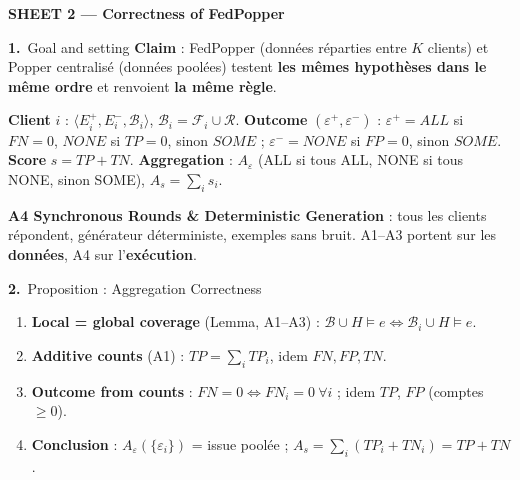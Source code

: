 \documentclass[10pt]{article}
\newcommand{\num}[1]{\textcolor{marine}{\textbf{#1.}}~}
\begin{document}
\vspace{6pt}
{\large\bfseries\textcolor{marine}{SHEET 2 --- Correctness of FedPopper}}\par\vspace{2pt}
\begin{minipage}[t]{0.495\textwidth}\vspace{0pt}
\begin{bloc}[fontupper=\scriptsize\raggedright]{\num{1}Goal and setting}
\textbf{Claim} : FedPopper (données réparties entre $K$ clients) et Popper centralisé (données poolées) testent \textbf{les mêmes hypothèses dans le même ordre} et renvoient \textbf{la même règle}.\par
\textbf{Client} $i$ : $\langle E_i^+,E_i^-,\mathcal{B}_i\rangle$, $\mathcal{B}_i=\mathcal{F}_i\cup\mathcal{R}$. \textbf{Outcome} $(\varepsilon^+,\varepsilon^-)$ : $\varepsilon^+=\mathit{ALL}$ si $FN=0$, $\mathit{NONE}$ si $TP=0$, sinon $\mathit{SOME}$ ; $\varepsilon^-=\mathit{NONE}$ si $FP=0$, sinon $\mathit{SOME}$. \textbf{Score} $s=TP+TN$. \textbf{Aggregation} : $A_\varepsilon$ (ALL si tous ALL, NONE si tous NONE, sinon SOME), $A_s=\sum_i s_i$.\par
\textbf{A4 Synchronous Rounds \& Deterministic Generation} : tous les clients répondent, générateur déterministe, exemples sans bruit. A1--A3 portent sur les \textbf{données}, A4 sur l'\textbf{exécution}.
\end{bloc}
\vspace{2pt}
\begin{bloc}[fontupper=\scriptsize\raggedright]{\num{2}Proposition : Aggregation Correctness}
\begin{enumerate}[leftmargin=12pt, itemsep=0pt, topsep=1pt]
  \item \textbf{Local = global coverage} (Lemma, A1--A3) : $\mathcal{B}\cup H\models e\iff\mathcal{B}_i\cup H\models e$.
  \item \textbf{Additive counts} (A1) : $TP=\sum_i TP_i$, idem $FN,FP,TN$.
  \item \textbf{Outcome from counts} : $FN=0\iff FN_i=0\ \forall i$ ; idem $TP$, $FP$ (comptes $\ge0$).
  \item \textbf{Conclusion} : $A_\varepsilon(\{\varepsilon_i\})$ = issue poolée ; $A_s=\sum_i(TP_i+TN_i)=TP+TN$.
\end{enumerate}
\end{bloc}
\end{minipage}\hfill\begin{minipage}[t]{0.495\textwidth}\vspace{0pt}

\end{minipage}
\end{document}
